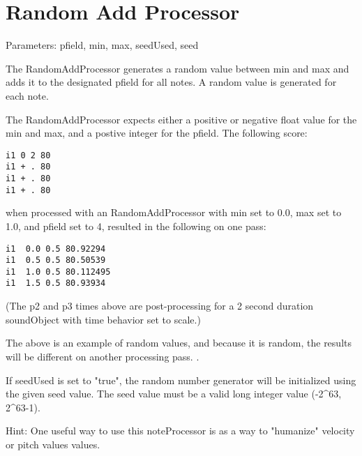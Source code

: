 \section{Random Add Processor}\label{randomAddProcessor}

Parameters: pfield, min, max, seedUsed, seed

The RandomAddProcessor generates a random value between min and max and
adds it to the designated pfield for all notes. A random value is
generated for each note.

The RandomAddProcessor expects either a positive or negative float value
for the min and max, and a postive integer for the pfield. The following
score:

\begin{verbatim}
i1 0 2 80
i1 + . 80
i1 + . 80
i1 + . 80
\end{verbatim}

when processed with an RandomAddProcessor with min set to 0.0, max set
to 1.0, and pfield set to 4, resulted in the following on one pass:

\begin{verbatim}
i1  0.0 0.5 80.92294
i1  0.5 0.5 80.50539
i1  1.0 0.5 80.112495
i1  1.5 0.5 80.93934
\end{verbatim}

(The p2 and p3 times above are post-processing for a 2 second duration
soundObject with time behavior set to scale.)

The above is an example of random values, and because it is random, the
results will be different on another processing pass. .

If seedUsed is set to "true", the random number generator will be
initialized using the given seed value. The seed value must be a valid
long integer value (-2\^{}63, 2\^{}63-1).

Hint: One useful way to use this noteProcessor is as a way to "humanize"
velocity or pitch values values.
